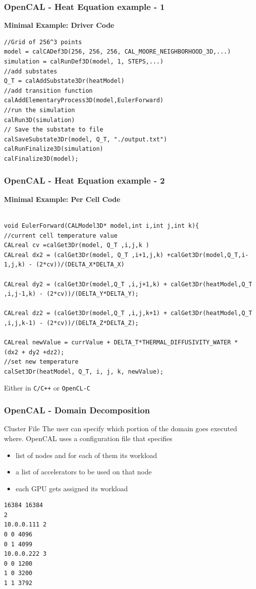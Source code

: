 \begin{frame}[fragile]
\frametitle{OpenCAL - Heat Equation example - 1} 
\centering\textbf{Minimal Example: Driver Code}
  \begin{lstlisting}[numbers=none]
//Grid of 256^3 points
model = calCADef3D(256, 256, 256, CAL_MOORE_NEIGHBORHOOD_3D,...)
simulation = calRunDef3D(model, 1, STEPS,...)
//add substates
Q_T = calAddSubstate3Dr(heatModel)
//add transition function
calAddElementaryProcess3D(model,EulerForward)
//run the simulation
calRun3D(simulation)
// Save the substate to file
calSaveSubstate3Dr(model, Q_T, "./output.txt")
calRunFinalize3D(simulation)
calFinalize3D(model);
\end{lstlisting}
\end{frame}
\begin{frame}[fragile]
\frametitle{OpenCAL - Heat Equation example - 2} 
\centering\textbf{Minimal Example: Per Cell Code}
\begin{lstlisting}[numbers=none]

void EulerForward(CALModel3D* model,int i,int j,int k){
//current cell temperature value
CALreal cv =calGet3Dr(model, Q_T ,i,j,k )
CALreal dx2 = (calGet3Dr(model, Q_T ,i+1,j,k) +calGet3Dr(model,Q_T,i-1,j,k) - (2*cv))/(DELTA_X*DELTA_X)

CALreal dy2 = (calGet3Dr(model,Q_T ,i,j+1,k) + calGet3Dr(heatModel,Q_T ,i,j-1,k) - (2*cv))/(DELTA_Y*DELTA_Y);

CALreal dz2 = (calGet3Dr(model,Q_T ,i,j,k+1) + calGet3Dr(heatModel,Q_T ,i,j,k-1) - (2*cv))/(DELTA_Z*DELTA_Z);

CALreal newValue = currValue + DELTA_T*THERMAL_DIFFUSIVITY_WATER * (dx2 + dy2 +dz2);
//set new temperature
calSet3Dr(heatModel, Q_T, i, j, k, newValue);

\end{lstlisting}
\centering
Either in \texttt{C/C++} or \texttt{OpenCL-C}
\end{frame}


\begin{frame}[fragile]
\frametitle{OpenCAL - Domain Decomposition} 
	\begin{block}{Cluster File}
		The user can specify which portion of the domain goes executed where.
		OpenCAL uses a configuration file that specifies
		\begin{itemize}
			\item list of nodes and for each of them its workload
			\item a list of accelerators to be used on that node
			\item each GPU gets assigned its workload
		\end{itemize}
	\end{block}
\begin{lstlisting}[numbers=none, basicstyle=\small]
16384 16384
2
10.0.0.111 2
0 0 4096
0 1 4099
10.0.0.222 3
0 0 1200
1 0 3200
1 1 3792
\end{lstlisting}
\end{frame}


